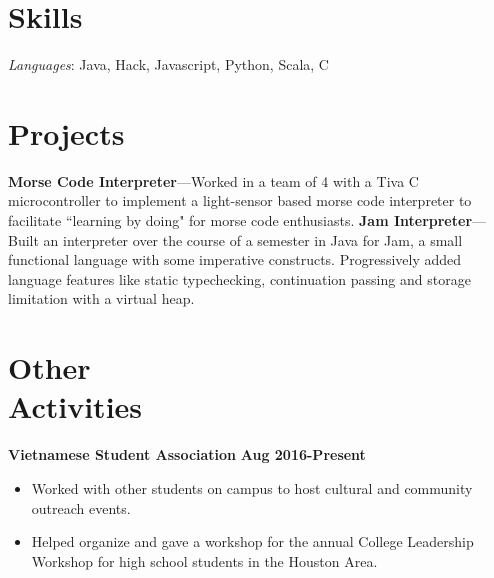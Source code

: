 \documentclass[margin,line]{resume}
\begin{document}
\begin{resume}
\section{\mysidestyle Skills}

\emph{Languages}: Java, Hack, Javascript, Python, Scala, C\\

\section{\mysidestyle Projects}

\textbf{Morse Code Interpreter}---Worked in a team of 4 with a Tiva C microcontroller to implement a light-sensor based morse code interpreter to facilitate ``learning by doing" for morse code enthusiasts.
\textbf{Jam Interpreter}---Built an interpreter over the course of a semester in Java for Jam, a small functional language with some imperative constructs. 
Progressively added language features like static typechecking, continuation passing and storage limitation with a virtual heap.

\section{\mysidestyle Other\\ Activities}
\textbf{Vietnamese Student Association} \hfill \textbf{Aug 2016-Present}
\begin{itemize}
    \item Worked with other students on campus to host cultural and community outreach events.
    \item Helped organize and gave a workshop for the annual College Leadership Workshop for high school students in the Houston Area.
\end{itemize}



\end{resume}
\end{document}
